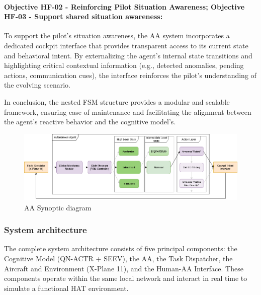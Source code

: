 \documentclass[12pt,a4paper]{article} %
\begin{document}
	\paragraph{Objective HF-02 - Reinforcing Pilot Situation Awareness; Objective HF-03 - Support shared situation awareness:}  
	To support the pilot's situation awareness, the AA system incorporates a dedicated cockpit interface that provides transparent access to its current state and behavioral intent. By externalizing the agent's internal state transitions and highlighting critical contextual information (e.g., detected anomalies, pending actions, communication cues), the interface reinforces the pilot's understanding of the evolving scenario. 

	In conclusion, the nested FSM structure provides a modular and scalable framework, ensuring ease of maintenance and facilitating the alignment between the agent's reactive behavior and the cognitive model's.

	\begin{figure}[H]
		\centering
		\includegraphics[width=1.0\textwidth]{./images/AA_synoptic.png}
		\caption{AA Synoptic diagram}
		\label{fig:aa_synoptic}
	\end{figure}
	
	\subsubsection{System architecture}
	The complete system architecture consists of five principal components: the Cognitive Model (QN-ACTR + SEEV), the AA, the Task Dispatcher, the Aircraft and Environment (X-Plane 11), and the Human-AA Interface. These components operate within the same local network and interact in real time to simulate a functional HAT environment.
	
\end{document}
